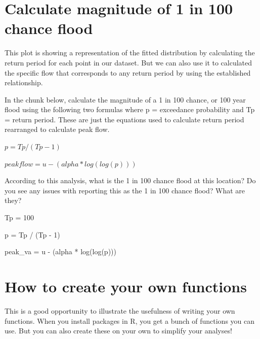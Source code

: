 \documentclass[
]{book}
\newenvironment{Shaded}{\begin{snugshade}}{\end{snugshade}}
\newcommand{\DecValTok}[1]{\textcolor[rgb]{0.00,0.00,0.81}{#1}}
\newcommand{\FunctionTok}[1]{\textcolor[rgb]{0.00,0.00,0.00}{#1}}
\newcommand{\NormalTok}[1]{#1}
\newcommand{\OtherTok}[1]{\textcolor[rgb]{0.56,0.35,0.01}{#1}}
\newcommand{\SpecialCharTok}[1]{\textcolor[rgb]{0.00,0.00,0.00}{#1}}
\begin{document}
\hypertarget{calculate-magnitude-of-1-in-100-chance-flood}{%
\section{Calculate magnitude of 1 in 100 chance flood}\label{calculate-magnitude-of-1-in-100-chance-flood}}

This plot is showing a representation of the fitted distribution by calculating the return period for each point in our dataset. But we can also use it to calculated the specific flow that corresponds to any return period by using the established relationship.

In the chunk below, calculate the magnitude of a 1 in 100 chance, or 100 year flood using the following two formulas where p = exceedance probability and Tp = return period. These are just the equations used to calculate return period rearranged to calculate peak flow.

\(p = Tp / (Tp - 1)\)

\(peakflow = u - (alpha * log(log(p)))\)

According to this analysis, what is the 1 in 100 chance flood at this location? Do you see any issues with reporting this as the 1 in 100 chance flood? What are they?

\begin{Shaded}
\begin{Highlighting}[]
\NormalTok{Tp }\OtherTok{=} \DecValTok{100}

\NormalTok{p }\OtherTok{=}\NormalTok{ Tp }\SpecialCharTok{/}\NormalTok{ (Tp }\SpecialCharTok{{-}} \DecValTok{1}\NormalTok{)}

\NormalTok{peak\_va }\OtherTok{=}\NormalTok{ u }\SpecialCharTok{{-}}\NormalTok{ (alpha }\SpecialCharTok{*} \FunctionTok{log}\NormalTok{(}\FunctionTok{log}\NormalTok{(p)))}
\end{Highlighting}
\end{Shaded}

\hypertarget{how-to-create-your-own-functions}{%
\section{How to create your own functions}\label{how-to-create-your-own-functions}}

This is a good opportunity to illustrate the usefulness of writing your own functions. When you install packages in R, you get a bunch of functions you can use. But you can also create these on your own to simplify your analyses!
\end{document}
